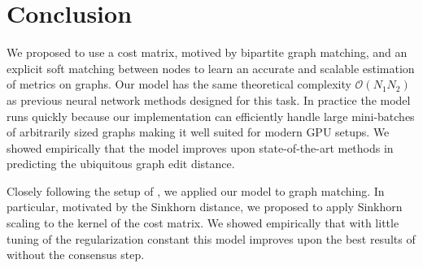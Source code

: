 \section{Conclusion}


We proposed to use a cost matrix, motived by bipartite graph matching, and an explicit soft matching between nodes to learn an accurate and scalable estimation of metrics on graphs. Our model has the same theoretical complexity $\mathcal{O}(N_1 N_2)$ as previous neural network methods designed for this task. In practice the model runs quickly because our implementation can efficiently handle large mini-batches of arbitrarily sized graphs making it well suited for modern GPU setups. We showed empirically that the model improves upon state-of-the-art methods in predicting the ubiquitous graph edit distance.



Closely following the setup of \cite{fey2020_update}, we applied our model to graph matching. In particular, motivated by the Sinkhorn distance, we proposed to apply Sinkhorn scaling to the kernel of the cost matrix. We showed empirically that with little tuning of the regularization constant this model improves upon the best results of \cite{fey2020_update} without the consensus step.

